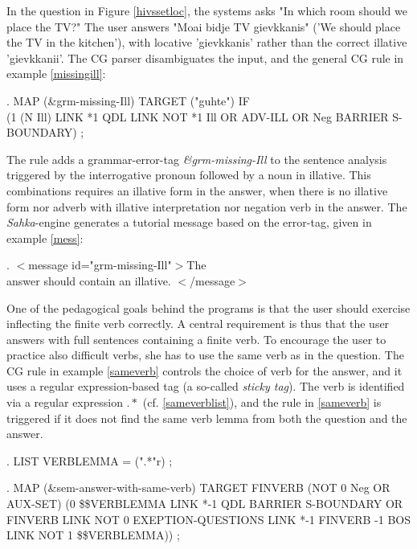 \documentclass[11pt]{article}
\begin{document}
In the question in Figure \ref{hivssetloc}, the systems asks "In which room should we place the TV?" The user answers "Moai bidje TV gievkkanis" ('We should place the TV in the kitchen'), with locative 'gievkkanis' rather than the correct illative 'gievkkanii'. The CG parser disambiguates the input, and the general CG rule in example \ref{missingill}: 

\ex.\flushleft\label{missingill} \small{MAP (\&grm-missing-Ill) TARGET ("guhte") IF \\(1 (N Ill) LINK *1 QDL LINK NOT *1 Ill OR ADV-ILL OR Neg BARRIER S-BOUNDARY) ;}

The rule adds a grammar-error-tag \textit{\&grm-missing-Ill} to the sentence analysis triggered by the interrogative pronoun followed by a noun in illative. This combinations requires an illative form in the answer, when there is no illative form nor adverb with illative interpretation nor negation verb in the answer. The \textit{Sahka}-engine generates a tutorial message based on the error-tag, given in example \ref{mess}:  

\ex.\label{mess} \small{$<$message id="grm-missing-Ill"$>$The \\answer should contain an illative. $<$/message$>$}


One of the pedagogical goals behind the programs is that the user should exercise inflecting the finite verb correctly. A central requirement is thus that the user answers with full sentences containing a finite verb. To encourage the user to practice also difficult verbs, she has to use the same verb as in the question. The CG rule in example \ref{sameverb} controls the choice of verb for the answer, and it uses a regular expression-based tag (a so-called \textit{sticky tag}). The verb is identified via a regular expression $.*$ (cf. \ref{sameverblist}), and the rule in \ref{sameverb} is triggered if it does not find the same verb lemma from both the question and the answer.

\ex.\flushleft\label{sameverblist} \small{LIST VERBLEMMA = (".*"r) ;}

\ex.\flushleft\label{sameverb} \small{MAP (\&sem-answer-with-same-verb) TARGET FINVERB (NOT 0 Neg OR AUX-SET) (0 \$\$VERBLEMMA LINK *-1 QDL BARRIER S-BOUNDARY OR FINVERB LINK NOT 0 EXEPTION-QUESTIONS LINK *-1 FINVERB -1 BOS LINK NOT 1 \$\$VERBLEMMA)) ;}
\end{document}
